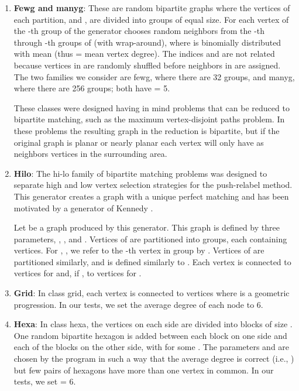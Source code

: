 \documentclass{article}
\begin{document}
\begin{enumerate}
\item {\bf Fewg and manyg}: These are random bipartite graphs where the vertices of each partition,  and  , are divided into  groups of equal size. For each vertex of the -th group of  the generator chooses  random neighbors from the -th through -th groups of  (with wrap-around), where  is binomially distributed with mean  (thus  = mean vertex degree). The indices  and  are not related because vertices in  are randomly shuffled before neighbors in  are assigned. The two families we consider are {\sf fewg}, where there are 32 groups, and {\sf manyg}, where there are 256 groups; both have  = 5.

These classes were designed having in mind problems that can be reduced to bipartite matching, such as the maximum vertex-disjoint paths problem. In these problems the resulting graph in the reduction is bipartite, but if the original graph is planar or nearly planar each vertex will only have as neighbors vertices in the surrounding area.

\item {\bf Hilo}: The {\sf hi-lo} family of bipartite matching problems was designed to separate high and low vertex selection strategies for the push-relabel method. This generator creates a graph with a unique perfect matching and has been motivated by a generator of Kennedy \cite{Ken95}.

Let  be a graph produced by this generator. This graph is defined by three parameters, , , and . Vertices of  are partitioned into  groups, each containing  vertices. For , , we refer to the -th vertex in group  by . Vertices of  are partitioned similarly, and  is defined similarly to . Each vertex  is connected to vertices  for  and, if , to vertices  for .

\item {\bf Grid}: In class {\sf grid}, each vertex  is connected to vertices  where  is a geometric progression. In our tests, we set the average degree of each node to 6.

\item {\bf Hexa}: In class {\sf hexa}, the vertices on each side are divided into  blocks of size . One random bipartite hexagon is added between each block  on one side and each of the blocks  on the other side, with  for some . The parameters  and  are chosen by the program in such a way that the average degree is correct (i.e., ) but few pairs of hexagons have more than one vertex in common. In our tests, we set  = 6.


\end{enumerate}
\end{document}
